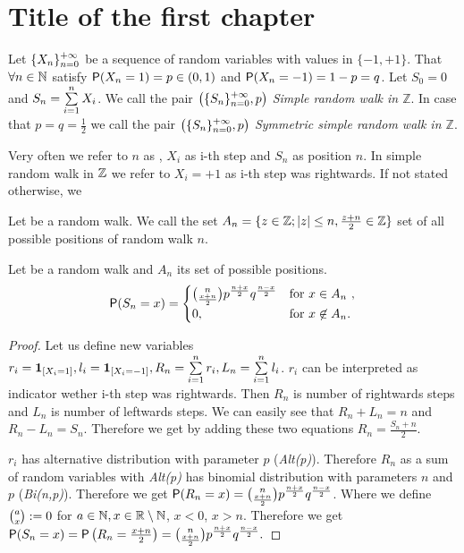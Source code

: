 \chapter{Title of the first chapter}

\begin{defn}\label{defn-simple_random_walk_Z}
  Let $\{X_n\}_{n=0}^{+\infty}$ be a sequence of \iid random variables with values in $\{ -1, +1\}$. That $\forall n \in \mathbb{N}$ satisfy $\operatorname{\textsf{P}}(X_n=1)=p \in (0,1)$ and $\operatorname{\textsf{P}}(X_n=-1)=1-p=q$. Let $S_0=0$ and $S_n=\suma[i][1][n]X_i$. We call the pair $\left(\{S_n\}_{n=0}^{+\infty}, p \right)$ \emph{Simple random walk in $\mathbb{Z}$}. In case that $p=q=\frac{1}{2}$ we call the pair $\left(\{S_n\}_{n=0}^{+\infty}, p \right)$ \emph{Symmetric simple random walk in $\mathbb{Z}$}.
\end{defn}

\begin{rem}
  Very often we refer to $n$ as \Time, $X_i$ as i-th step and $S_n$ as position \intime $n$. In simple random walk in $\mathbb{Z}$ we refer to $X_i=+1$ as i-th step was rightwards. If not stated otherwise, we
\end{rem}

\begin{defn}\label{defn-set_all_possible_values}
  Let \rw be a random walk. We call the set $A_n=\{z \in \mathbb{Z}; \left|{z}\right|\leq n, \frac{z+n}{2}\in \mathbb{Z} \}$ set of all possible positions of random walk \rw \intime $n$.
\end{defn}

\begin{thm}\label{thm-probability_position_time}
  Let \rw be a random walk and $A_n$ its set of possible positions.
  \[
  \operatorname{\textsf{P}}(S_n=x)=
  \begin{cases}
  \binom{n}{\frac{x+n}{2}}p^{\frac{n+x}{2}}q^{\frac{n-x}{2}} & \text{for $x \in A_n$ },\\
  0, & \text{for $x \not\in A_n$}.
  \end{cases}
  \]
\end{thm}
\begin{proof}
  Let us define new variables $r_i=\indikator{X_i=1}, l_i=\indikator{X_i=-1}, R_n=\suma r_i, L_n=\suma l_i$. $r_i$ can be interpreted as indicator wether i-th step was rightwards. Then $R_n$ is number of rightwards steps and $L_n$ is number of leftwards steps. We can easily see that $R_n+L_n=n$ and $R_n-L_n=S_n$. Therefore we get by adding these two equations $R_n=\frac{S_n+n}{2}.$

  $r_i$ has alternative distribution with parameter $p$ (\textit{Alt(p)}). Therefore $R_n$ as a sum of \iid random variables with \textit{Alt(p)} has binomial distribution with parameters $n$ and $p$ (\textit{Bi(n,p)}). Therefore we get $\operatorname{\textsf{P}}(R_n=x)=\binom{n}{\frac{x+n}{2}}p^{\frac{n+x}{2}}q^{\frac{n-x}{2}}$. Where we define $\binom{a}{x}:= 0$ for $a \in \mathbb{N}, x\in \mathbb{R} \setminus \mathbb{N}$, $x<0$, $x>n$. Therefore we get $\operatorname{\textsf{P}}(S_n=x)=\operatorname{\textsf{P}}\left( R_n=\frac{x+n}{2}\right)=  \binom{n}{\frac{x+n}{2}}p^{\frac{n+x}{2}}q^{\frac{n-x}{2}}.$
\end{proof}



